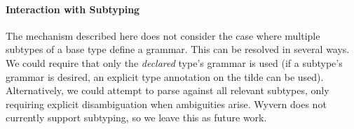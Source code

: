 \paragraph{Interaction with Subtyping}
The mechanism described here does not consider the case where multiple subtypes of a base type define a grammar. This can be resolved in several ways. We could require that only the \emph{declared} type's grammar is used (if a subtype's grammar is desired, an explicit type annotation on the tilde can be used). Alternatively, we could attempt to parse against all relevant subtypes, only requiring explicit disambiguation when ambiguities arise. Wyvern does not currently support subtyping, so we leave this as future work.
%
%
%
%
